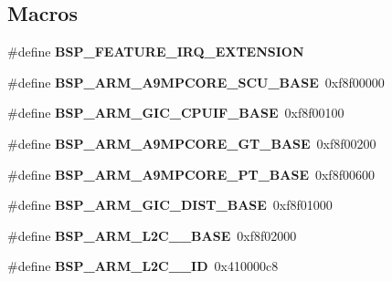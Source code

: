 \subsection*{Macros}
\begin{DoxyCompactItemize}
\item 
\mbox{\label{group__RTEMSBSPsARMZynq_ga5d7d631d3a14b7554160f14eb42f351b}} 
\#define {\bfseries B\+S\+P\+\_\+\+F\+E\+A\+T\+U\+R\+E\+\_\+\+I\+R\+Q\+\_\+\+E\+X\+T\+E\+N\+S\+I\+ON}
\item 
\mbox{\label{group__RTEMSBSPsARMZynq_ga180004170c65ed2eaa91050be70aa480}} 
\#define {\bfseries B\+S\+P\+\_\+\+A\+R\+M\+\_\+\+A9\+M\+P\+C\+O\+R\+E\+\_\+\+S\+C\+U\+\_\+\+B\+A\+SE}~0xf8f00000
\item 
\mbox{\label{group__RTEMSBSPsARMZynq_ga82979270e5d617859b19ad1830434bb6}} 
\#define {\bfseries B\+S\+P\+\_\+\+A\+R\+M\+\_\+\+G\+I\+C\+\_\+\+C\+P\+U\+I\+F\+\_\+\+B\+A\+SE}~0xf8f00100
\item 
\mbox{\label{group__RTEMSBSPsARMZynq_gafdfd032028e40b1b0e2fcdbcebf24250}} 
\#define {\bfseries B\+S\+P\+\_\+\+A\+R\+M\+\_\+\+A9\+M\+P\+C\+O\+R\+E\+\_\+\+G\+T\+\_\+\+B\+A\+SE}~0xf8f00200
\item 
\mbox{\label{group__RTEMSBSPsARMZynq_ga238a3535d48de7205020be9a4acc8df5}} 
\#define {\bfseries B\+S\+P\+\_\+\+A\+R\+M\+\_\+\+A9\+M\+P\+C\+O\+R\+E\+\_\+\+P\+T\+\_\+\+B\+A\+SE}~0xf8f00600
\item 
\mbox{\label{group__RTEMSBSPsARMZynq_ga74b3234f20bb7c846a4b35c68bbb0703}} 
\#define {\bfseries B\+S\+P\+\_\+\+A\+R\+M\+\_\+\+G\+I\+C\+\_\+\+D\+I\+S\+T\+\_\+\+B\+A\+SE}~0xf8f01000
\item 
\mbox{\label{group__RTEMSBSPsARMZynq_ga391fae2c7d3fd5e1a00a7e35c957f7e5}} 
\#define {\bfseries B\+S\+P\+\_\+\+A\+R\+M\+\_\+\+L2\+C\+\_\+\_\+\+B\+A\+SE}~0xf8f02000
\item 
\mbox{\label{group__RTEMSBSPsARMZynq_gae8b45f48489ee7827e4e919e5e65bb25}} 
\#define {\bfseries B\+S\+P\+\_\+\+A\+R\+M\+\_\+\+L2\+C\+\_\+\_\+\+ID}~0x410000c8
\end{DoxyCompactItemize}
